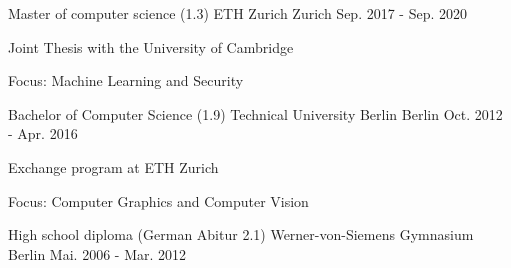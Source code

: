 

\begin{cventries}

  \cventry
    {Master of computer science (1.3)} %
    {ETH Zurich} %
    {Zurich} %
    {Sep. 2017 - Sep. 2020} %
    {
      \begin{cvitems} %
        \item {Joint Thesis with the University of Cambridge}
        \item {Focus: Machine Learning and Security}
      \end{cvitems}
    }


  \cventry
    {Bachelor of Computer Science (1.9)} %
    {Technical University Berlin} %
    {Berlin} %
    {Oct. 2012 - Apr. 2016} %
    {
      \begin{cvitems} %
        \item {Exchange program at ETH Zurich}
        \item {Focus: Computer Graphics and Computer Vision}
      \end{cvitems}
    }


  \cventry
    {High school diploma (German Abitur 2.1)} %
    {Werner-von-Siemens Gymnasium} %
    {Berlin} %
    {Mai. 2006 - Mar. 2012} %
    {}

\end{cventries}
